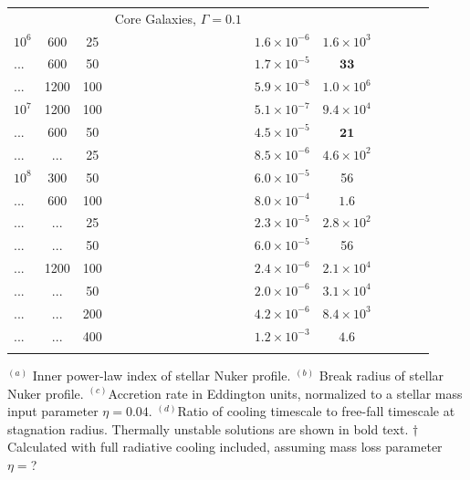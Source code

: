 \documentclass[usenatbib,fleqn]{mn2e}
\begin{document}
\begin{table}
\begin{threeparttable}
\begin{minipage}{18cm}
\begin{tabular}{lccccccccc}
  \hline
 & & & Core Galaxies, $\Gamma = 0.1$ & & & & & & \\
$    10^{ 6 }$ & 600  &25 & & $ 1.6 \times 10^{ -6 }$ & $ 1.6 \times 10^{ 3 }$ \\
  ...  & 600  & 50 & &$ 1.7 \times 10^{ -5 }$ & $\mathbf{33}$ \\
  ...  & 1200  & 100 && $ 5.9 \times 10^{ -8 }$ & $ 1.0 \times 10^{ 6 }$ \\
  $    10^{ 7 }$ & 1200  & 100& & $ 5.1 \times 10^{ -7 }$ & $ 9.4 \times 10^{ 4 }$ \\
  ...  & 600  & 50 && $ 4.5 \times 10^{ -5 }$ & $\mathbf{21}$ \\
  ...  & ...  & 25 & &$ 8.5 \times 10^{ -6 }$ & $ 4.6 \times 10^{ 2 }$ \\
$10^{8}$  & 300  & 50 & & $ 6.0 \times 10^{ -5 }$ & 56 \\
  ...  & 600  & 100 & &$ 8.0 \times 10^{ -4 }$ & $\mathbf{1.6}$ \\
  ...  &  ...  & 25 && $ 2.3 \times 10^{ -5 }$ & $ 2.8 \times 10^{ 2 }$ \\
  ...  &  ...  & 50 && $ 6.0 \times 10^{ -5 }$ & 56 \\
... & 1200 & 100 && $ 2.4 \times 10^{ -6 }$ & $ 2.1 \times 10^{ 4 }$ \\
  ...  & ...  & 50 && $ 2.0 \times 10^{ -6 }$ & $ 3.1 \times 10^{ 4 }$ \\
  ...  &  ...  & 200 && $ 4.2 \times 10^{ -6 }$ & $ 8.4 \times 10^{ 3 }$ \\
  ...  &  ... & 400 && $ 1.2 \times 10^{ -3 }$ & $\mathbf{4.6}$ \\
  \hline
\label{table:models}  
\end{tabular}
\begin{tablenotes}
\item $^{(a)}$ Inner power-law index of stellar Nuker profile.  $^{(b)}$
Break radius of stellar Nuker profile.  $^{(c)}$Accretion rate in
Eddington units, normalized to a stellar mass input parameter $\eta =
0.04$.  $^{(d)}$Ratio of cooling timescale to free-fall timescale at
stagnation radius.  Thermally unstable solutions are shown in bold
text.  $\dagger$Calculated with full radiative cooling included, assuming mass loss parameter $\eta = $? 
\end{tablenotes}
\end{minipage}
\end{threeparttable}

\end{table}
\end{document}
